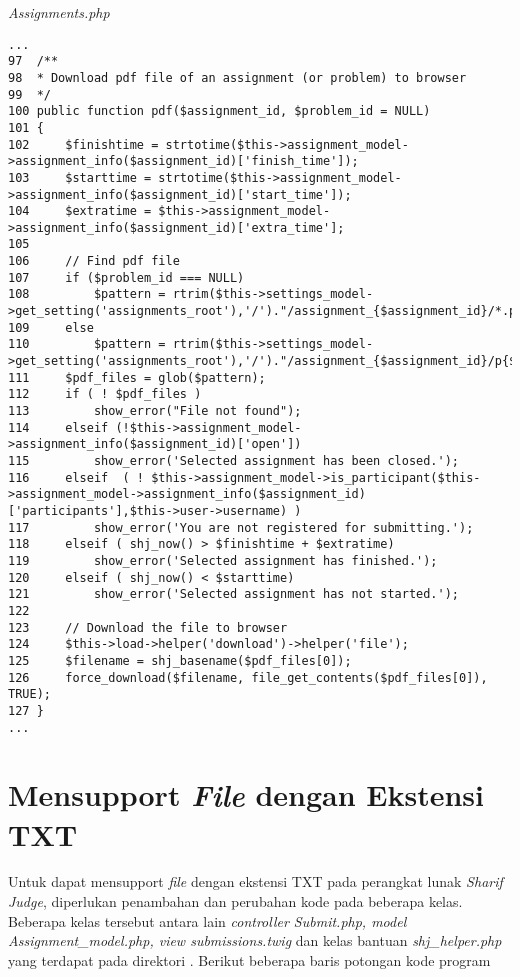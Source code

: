 \textit{Assignments.php}
\begin{lstlisting}[basicstyle=\ttfamily, frame=single,
columns=fullflexible, keepspaces=true, breaklines=true]
...
97	/**
98	* Download pdf file of an assignment (or problem) to browser
99	*/
100	public function pdf($assignment_id, $problem_id = NULL)
101	{
102		$finishtime = strtotime($this->assignment_model->assignment_info($assignment_id)['finish_time']);
103		$starttime = strtotime($this->assignment_model->assignment_info($assignment_id)['start_time']);
104		$extratime = $this->assignment_model->assignment_info($assignment_id)['extra_time'];
105
106		// Find pdf file
107		if ($problem_id === NULL)
108			$pattern = rtrim($this->settings_model->get_setting('assignments_root'),'/')."/assignment_{$assignment_id}/*.pdf";
109		else
110			$pattern = rtrim($this->settings_model->get_setting('assignments_root'),'/')."/assignment_{$assignment_id}/p{$problem_id}/*.pdf";
111		$pdf_files = glob($pattern);
112		if ( ! $pdf_files )
113			show_error("File not found");
114		elseif (!$this->assignment_model->assignment_info($assignment_id)['open'])
115			show_error('Selected assignment has been closed.');
116		elseif	( ! $this->assignment_model->is_participant($this->assignment_model->assignment_info($assignment_id)['participants'],$this->user->username) )
117			show_error('You are not registered for submitting.');
118		elseif ( shj_now() > $finishtime + $extratime)
119			show_error('Selected assignment has finished.');
120		elseif ( shj_now() < $starttime)
121			show_error('Selected assignment has not started.');
122			
123		// Download the file to browser
124		$this->load->helper('download')->helper('file');
125		$filename = shj_basename($pdf_files[0]);
126		force_download($filename, file_get_contents($pdf_files[0]), TRUE);
127	}
...
\end{lstlisting}

\section{Mensupport \textit{File} dengan Ekstensi TXT}
Untuk dapat mensupport \textit{file} dengan ekstensi TXT pada perangkat lunak \textit{Sharif Judge}, diperlukan penambahan dan perubahan kode pada beberapa kelas. Beberapa kelas tersebut antara lain \textit{controller Submit.php, model Assignment\_model.php, view submissions.twig} dan kelas bantuan \textit{shj\_helper.php} yang terdapat pada direktori . Berikut beberapa baris potongan kode program


